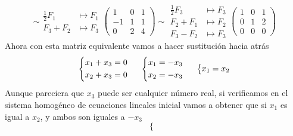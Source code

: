 \documentclass{article}
\begin{document}
\begin{enumerate}
\[            \sim
            \begin{aligned}
                \frac{1}{2}F_1 &\mapsto F_1 \\
                F_3 + F_2 &\mapsto F_3
            \end{aligned}
            \begin{pmatrix}
                1 & 0 & 1 \\
                -1 & 1 & 1 \\ 
                0 & 2 & 4
            \end{pmatrix}
            \sim
            \begin{aligned}
                \frac{1}{2}F_3 &\mapsto F_3 \\
                F_2 + F_1 &\mapsto F_2 \\
                F_3 - F_2 &\mapsto F_3
            \end{aligned}
            \begin{pmatrix}
                1 & 0 & 1 \\
                0 & 1 & 2 \\ 
                0 & 0 & 0
            \end{pmatrix}
        \]
        Ahora con esta matriz equivalente vamos a hacer sustitución hacia atrás
        \[
            \left\{
                \begin{aligned}
                    x_1 + x_3 &= 0 \\
                    x_2 + x_3 &= 0 
                \end{aligned}
            \right.
            \hspace{0.5cm}
            \left\{
                \begin{aligned}
                    x_1 &= -x_3 \\
                    x_2 &= -x_3
                \end{aligned}
            \right.
            \hspace{0.5cm}
            \left\{
                \begin{aligned}
                    x_1 &= x_2 \\
                \end{aligned}
            \right.
        \]
        Aunque pareciera que \(x_3\) puede ser cualquier número real, si verificamos en el sistema homogéneo de ecuaciones lineales inicial vamos a 
        obtener que si \(x_1\) es igual a \(x_2\), y ambos son iguales a \(-x_3\)
        \[
            \left\{
            \begin{aligned}

\end{aligned}\]
\end{enumerate}
\end{document}
